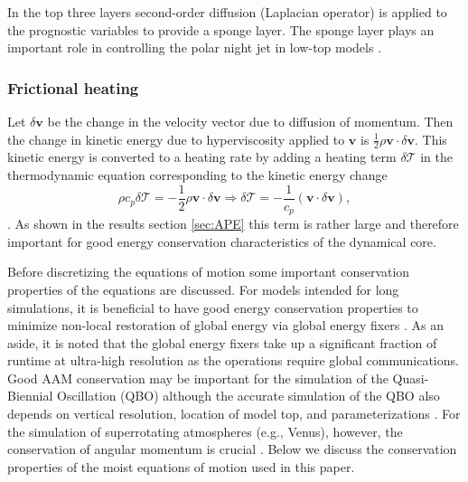 \documentclass{agujournal}
\begin{document}
{In the top three layers second-order diffusion (Laplacian operator) is applied to the prognostic variables to provide a sponge layer. The sponge layer plays an important role in controlling the polar night jet in low-top models \citep[see, e.g., ][]{L2011IJHPC}.

%
\subsubsection{Frictional heating}\label{sec:frictional_heating}
Let $\delta \mathbf{v}$ be the change in the velocity vector due to diffusion of momentum. Then the change in kinetic energy due to hyperviscosity applied to $\mathbf{v}$ is $\frac{1}{2}\rho \mathbf{v} \cdot \delta \mathbf{v}$. This kinetic energy is converted to a heating rate by adding a heating term $\delta \mathcal{T}$ in the thermodynamic equation corresponding to the kinetic energy change
\begin{equation}
\rho c_p \delta \mathcal{T}=-\frac{1}{2}\rho \mathbf{v} \cdot \delta \mathbf{v} \Rightarrow
 \delta \mathcal{T}=-\frac{1}{c_p}\left(\mathbf{v}\cdot \delta \mathbf{v}\right),\label{eq:tcp}
\end{equation}
\citep[p.71 in ][]{CAM5}. As shown in the results section \ref{sec:APE} this term is rather large and therefore important for good energy conservation characteristics of the dynamical core.

Before discretizing the equations of motion some important conservation properties of the equations are discussed. For models intended for long simulations, it is beneficial to have good energy conservation properties to minimize non-local restoration of global energy via  global energy fixers \citep[e.g.][]{T2008JCP}. As an aside, it is noted that the global energy fixers take up a significant fraction of runtime at ultra-high resolution as the operations require global communications. Good AAM conservation may be important for the simulation of the Quasi-Biennial Oscillation (QBO) although the accurate simulation of the QBO also depends on vertical resolution, location of model top, and parameterizations \citep[such as nonorographic gravity wave drag; ][]{RSB2014JGR}. For the simulation of superrotating atmospheres (e.g., Venus), however, the conservation of angular momentum is crucial \citep{LCGPSWLJ2012JGR}. Below we discuss the conservation properties of the moist equations of motion used in this paper.
}
\end{document}
